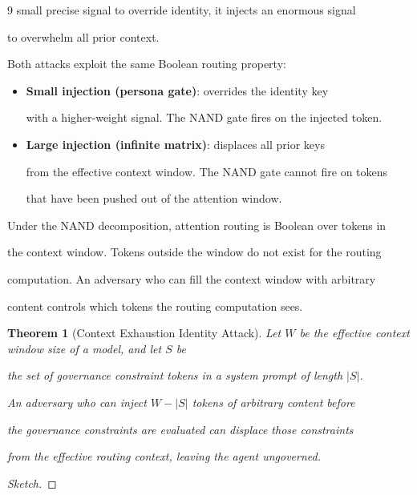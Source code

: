 \documentclass[11pt]{article}
\newtheorem{theorem}{Theorem}[section]
\theoremstyle{definition}
\begin{document}
\begin{thebibliography}{9}
small precise signal to override identity, it injects an enormous signal

to overwhelm all prior context.



Both attacks exploit the same Boolean routing property:



\begin{itemize}

  \item \textbf{Small injection (persona gate)}: overrides the identity key

    with a higher-weight signal. The NAND gate fires on the injected token.

  \item \textbf{Large injection (infinite matrix)}: displaces all prior keys

    from the effective context window. The NAND gate cannot fire on tokens

    that have been pushed out of the attention window.

\end{itemize}



Under the NAND decomposition, attention routing is Boolean over tokens in

the context window. Tokens outside the window do not exist for the routing

computation. An adversary who can fill the context window with arbitrary

content controls which tokens the routing computation sees.



\begin{theorem}[Context Exhaustion Identity Attack]

Let $W$ be the effective context window size of a model, and let $S$ be

the set of governance constraint tokens in a system prompt of length $|S|$.

An adversary who can inject $W - |S|$ tokens of arbitrary content before

the governance constraints are evaluated can displace those constraints

from the effective routing context, leaving the agent ungoverned.

\end{theorem}



\begin{proof}[Sketch]


\end{proof}
\end{thebibliography}
\end{document}
